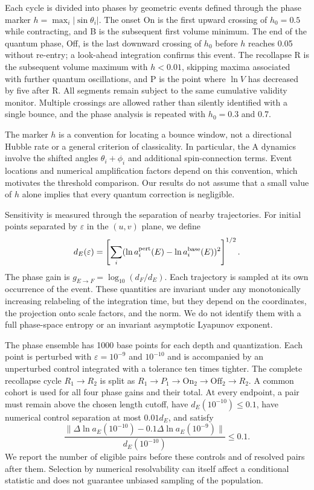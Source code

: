 \documentclass[12pt]{iopjournal}
\begin{document}
Each cycle is divided into phases by geometric events defined through the phase marker $h=\max_i|\sin\theta_i|$.
The onset On is the first upward crossing of $h_0=0.5$ while contracting, and B is the subsequent first
volume minimum. The end of the quantum phase, Off, is the last downward crossing of $h_0$ before $h$
reaches 0.05 without re-entry; a look-ahead integration confirms this event. The recollapse R is the
subsequent volume maximum with $h<0.01$, skipping maxima associated with further quantum oscillations,
and P is the point where $\ln V$ has decreased by five after R. All segments remain subject to the same
cumulative validity monitor. Multiple crossings are allowed rather than silently identified with a
single bounce, and the phase analysis is repeated with $h_0=0.3$ and 0.7.

The marker $h$ is a convention for locating a bounce window, not a directional Hubble rate or a
general criterion of classicality. In particular, the A dynamics involve the shifted angles
$\theta_i+\phi_i$ and additional spin-connection terms. Event locations and numerical amplification
factors depend on this convention, which motivates the threshold comparison. Our results do not assume that a small value of $h$ alone implies that every quantum correction is negligible.

Sensitivity is measured through the separation of nearby trajectories. For initial points separated
by $\varepsilon$ in the $(u,v)$ plane, we define
\begin{equation}
d_E(\varepsilon)=\left[\sum_i(\ln a_i^{\rm pert}(E)-\ln a_i^{\rm base}(E))^2\right]^{1/2}.
\end{equation}
The phase gain is $g_{E\to F}=\log_{10}(d_F/d_E)$. Each trajectory is sampled at its own occurrence of the event. These quantities are invariant under any monotonically increasing relabeling of the integration time, but they depend on the coordinates, the projection onto scale factors, and the norm. We do not identify them with a full
phase-space entropy or an invariant asymptotic Lyapunov exponent.

The phase ensemble has 1000 base points for each depth and quantization. Each point is perturbed with $\varepsilon=10^{-9}$ and $10^{-10}$ and is accompanied by an unperturbed control integrated with a tolerance ten times tighter.
The complete recollapse cycle $R_1\to R_2$ is split as
$R_1\to P_1\to\mathrm{On}_2\to\mathrm{Off}_2\to R_2$.
A common cohort is used for all four phase gains and their total. At every endpoint, a pair must
remain above the chosen length cutoff, have $d_E(10^{-10})\le0.1$, have numerical control separation
at most $0.01d_E$, and satisfy
\begin{equation}
\frac{\|\Delta\ln a_E(10^{-10})-0.1\Delta\ln a_E(10^{-9})\|}{d_E(10^{-10})}\le0.1.
\label{eq:quality}
\end{equation}
We report the number of eligible pairs before these controls and of resolved pairs after them. Selection by numerical resolvability can itself affect a conditional statistic and does not guarantee unbiased sampling of the population.
\end{document}
